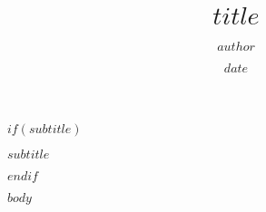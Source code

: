 \documentclass{book}
\title{$title$}
\author{$author$}
\date{$date$}
\begin{document}
\maketitle
\makeatletter
\renewcommand{\@chapapp}{}
\renewcommand{\chaptermark}[1]{
  \markboth{#1}{}
}
\makeatother





$if(subtitle)$
{\centering\large $subtitle$\par}
\vspace{1em}
$endif$

$body$
\end{document}
